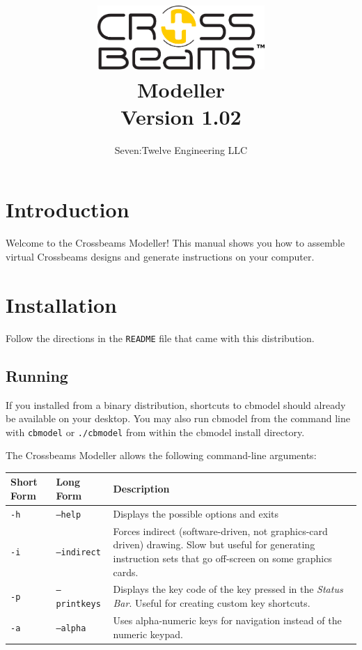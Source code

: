 \documentclass[12pt]{report}
\newcommand{\version}{1.02} %
\begin{document}

\title{\includegraphics[width=2.5in]{logo_black.png}\\\vspace{0.5in}Modeller\\Version \version}
\author{Seven:Twelve Engineering LLC}
\date{}
\maketitle

\clearpage

\section{Introduction}

Welcome to the Crossbeams Modeller!  This manual shows you how to
assemble virtual Crossbeams designs and generate instructions on your
computer.

\section{Installation}

Follow the directions in the {\tt README} file that came with this
distribution.

\subsection{Running}

If you installed from a binary distribution, shortcuts to cbmodel
should already be available on your desktop.  You may also run cbmodel
from the command line with {\tt cbmodel} or {\tt ./cbmodel} from
within the cbmodel install directory.

The Crossbeams Modeller allows the following command-line arguments:

\begin{center}
\begin{tabular}{llp{3in}}
Short Form & Long Form & Description\\
\hline
{\tt -h} & {\tt --help} & Displays the possible options and exits\\
{\tt -i} & {\tt --indirect} & Forces indirect (software-driven, not graphics-card driven) drawing.  Slow but useful for generating instruction sets that go off-screen on some graphics cards.\\
{\tt -p} & {\tt --printkeys} & Displays the key code of the key pressed in the \emph{Status Bar}.  Useful for creating custom key shortcuts.\\
{\tt -a} & {\tt --alpha} & Uses alpha-numeric keys for navigation instead of the numeric keypad.
\end{tabular}
\end{center}
\end{document}

